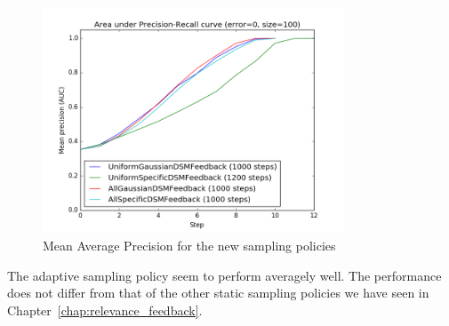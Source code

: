 \begin{figure}[h!]
  \centering
  \includegraphics[width=0.8\textwidth]{otago}
  \caption{Mean Average Precision for the new sampling policies}
  \label{fig:otago_adaptive_aoc}
\end{figure}

The adaptive sampling policy seem to perform averagely well. The performance
does not differ from that of the other static sampling policies we have seen in
Chapter~\ref{chap:relevance_feedback}.

